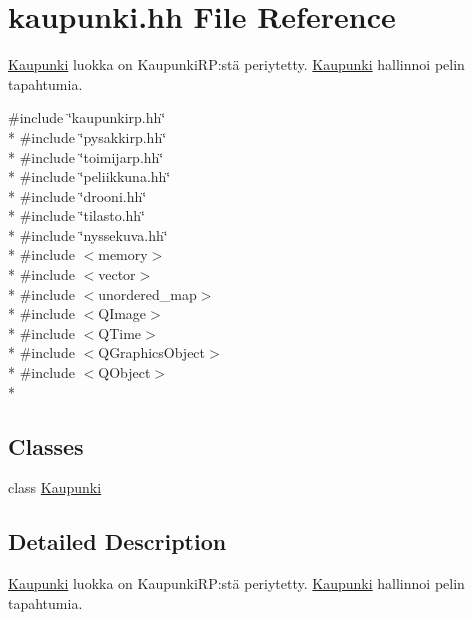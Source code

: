 \hypertarget{kaupunki_8hh}{\section{kaupunki.\-hh File Reference}
\label{kaupunki_8hh}
}


\hyperlink{class_kaupunki}{Kaupunki} luokka on Kaupunki\-R\-P\-:stä periytetty. \hyperlink{class_kaupunki}{Kaupunki} hallinnoi pelin tapahtumia.  


{\ttfamily \#include \char`\"{}kaupunkirp.\-hh\char`\"{}}\\*
{\ttfamily \#include \char`\"{}pysakkirp.\-hh\char`\"{}}\\*
{\ttfamily \#include \char`\"{}toimijarp.\-hh\char`\"{}}\\*
{\ttfamily \#include \char`\"{}peliikkuna.\-hh\char`\"{}}\\*
{\ttfamily \#include \char`\"{}drooni.\-hh\char`\"{}}\\*
{\ttfamily \#include \char`\"{}tilasto.\-hh\char`\"{}}\\*
{\ttfamily \#include \char`\"{}nyssekuva.\-hh\char`\"{}}\\*
{\ttfamily \#include $<$memory$>$}\\*
{\ttfamily \#include $<$vector$>$}\\*
{\ttfamily \#include $<$unordered\-\_\-map$>$}\\*
{\ttfamily \#include $<$Q\-Image$>$}\\*
{\ttfamily \#include $<$Q\-Time$>$}\\*
{\ttfamily \#include $<$Q\-Graphics\-Object$>$}\\*
{\ttfamily \#include $<$Q\-Object$>$}\\*
\subsection*{Classes}
\begin{DoxyCompactItemize}
\item 
class \hyperlink{class_kaupunki}{Kaupunki}
\end{DoxyCompactItemize}


\subsection{Detailed Description}
\hyperlink{class_kaupunki}{Kaupunki} luokka on Kaupunki\-R\-P\-:stä periytetty. \hyperlink{class_kaupunki}{Kaupunki} hallinnoi pelin tapahtumia. 